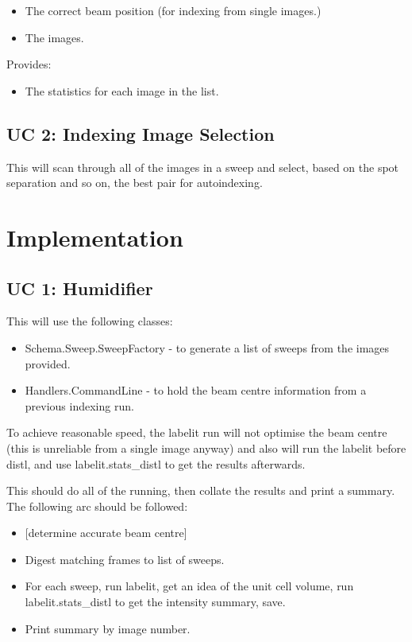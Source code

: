 \documentclass[a4paper, 11pt]{article}
\begin{document}
\begin{itemize}
\item{The correct beam position (for indexing from single images.)}
\item{The images.}
\end{itemize}

Provides:

\begin{itemize}
\item{The statistics for each image in the list.}
\end{itemize}

\subsection{UC 2: Indexing Image Selection}

This will scan through all of the images in a sweep and select, based on the
spot separation and so on, the best pair for autoindexing.

\section{Implementation}

\subsection{UC 1: Humidifier}

This will use the following classes:

\begin{itemize}
\item{Schema.Sweep.SweepFactory - to generate a list of sweeps from the 
images provided.}
\item{Handlers.CommandLine - to hold the beam centre information from a
previous indexing run.} 
\end{itemize}

To achieve reasonable speed, the labelit run will not optimise the beam
centre (this is unreliable from a single image anyway) and also will 
run the labelit before distl, and use labelit.stats\_distl to get the results
afterwards.

This should do all of the running, then collate the results and print a
summary. The following arc should be followed:

\begin{itemize}
\item{[determine accurate beam centre]}
\item{Digest matching frames to list of sweeps.}
\item{For each sweep, run labelit, get an idea of the unit cell volume,
run labelit.stats\_distl to get the intensity summary, save.}
\item{Print summary by image number.}
\end{itemize}
\end{document}
